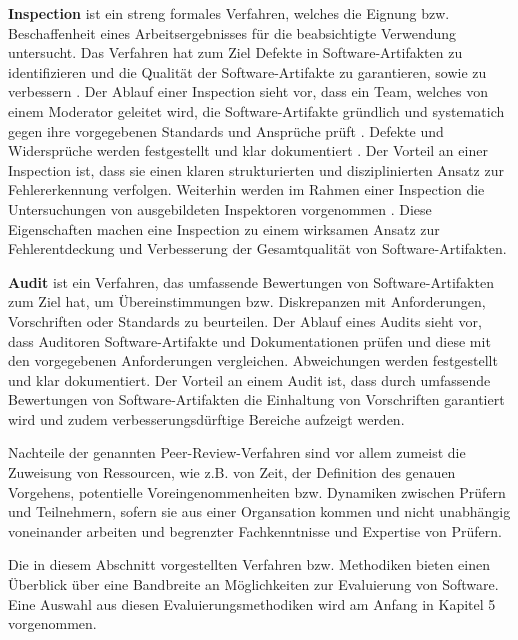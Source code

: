 \textbf{Inspection} ist ein streng formales Verfahren, welches die Eignung bzw. Beschaffenheit eines Arbeitsergebnisses für die beabsichtigte Verwendung untersucht.
Das Verfahren hat zum Ziel Defekte in Software-Artifakten zu identifizieren und die Qualität der Software-Artifakte zu garantieren, sowie zu verbessern \cite{ieee-1028-2008}.
Der Ablauf einer Inspection sieht vor, dass ein Team, welches von einem Moderator geleitet wird, die Software-Artifakte gründlich und systematich gegen ihre vorgegebenen Standards und Ansprüche prüft \cite{ieee-1028-2008}.
Defekte und Widersprüche werden festgestellt und klar dokumentiert \cite{ieee-1028-2008}.
Der Vorteil an einer Inspection ist, dass sie einen klaren strukturierten und disziplinierten Ansatz zur Fehlererkennung verfolgen.
Weiterhin werden im Rahmen einer Inspection die Untersuchungen von ausgebildeten Inspektoren vorgenommen \cite{ieee-1028-2008}.
Diese Eigenschaften machen eine Inspection zu einem wirksamen Ansatz zur Fehlerentdeckung und Verbesserung der Gesamtqualität von Software-Artifakten.

\textbf{Audit} ist ein Verfahren, das umfassende Bewertungen von Software-Artifakten zum Ziel hat, um Übereinstimmungen bzw. Diskrepanzen mit Anforderungen, Vorschriften oder Standards zu beurteilen.
Der Ablauf eines Audits sieht vor, dass Auditoren Software-Artifakte und Dokumentationen prüfen und diese mit den vorgegebenen Anforderungen vergleichen.
Abweichungen werden festgestellt und klar dokumentiert.
Der Vorteil an einem Audit ist, dass durch umfassende Bewertungen von Software-Artifakten die Einhaltung von Vorschriften garantiert wird und zudem verbesserungsdürftige Bereiche aufzeigt werden.

Nachteile der genannten Peer-Review-Verfahren sind vor allem zumeist die Zuweisung von Ressourcen, wie z.B. von Zeit, der Definition des genauen Vorgehens, potentielle Voreingenommenheiten bzw. Dynamiken zwischen Prüfern und Teilnehmern, sofern sie aus einer Organsation kommen und nicht unabhängig voneinander arbeiten und begrenzter Fachkenntnisse und Expertise von Prüfern.

Die in diesem Abschnitt vorgestellten Verfahren bzw. Methodiken bieten einen Überblick über eine Bandbreite an Möglichkeiten zur Evaluierung von Software. 
Eine Auswahl aus diesen Evaluierungsmethodiken wird am Anfang in Kapitel 5 vorgenommen.


